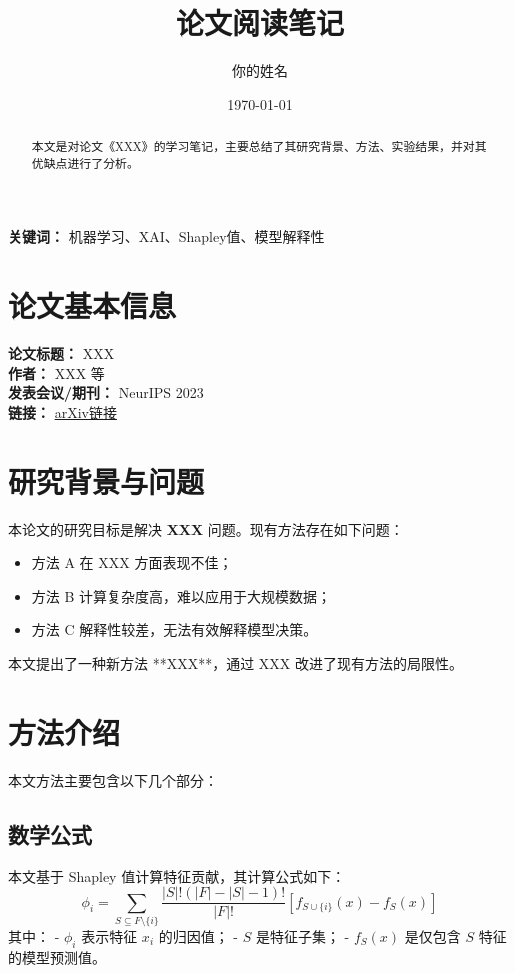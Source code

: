 \documentclass[a4paper,12pt]{article}
\title{论文阅读笔记}
\author{你的姓名}
\date{\today}
\begin{document}
\maketitle

\begin{abstract}
本文是对论文《XXX》的学习笔记，主要总结了其研究背景、方法、实验结果，并对其优缺点进行了分析。
\end{abstract}

\textbf{关键词：} 机器学习、XAI、Shapley值、模型解释性

\section{论文基本信息}
\textbf{论文标题：} XXX \\
\textbf{作者：} XXX 等 \\
\textbf{发表会议/期刊：} NeurIPS 2023 \\
\textbf{链接：} \href{https://arxiv.org/abs/XXX}{arXiv链接}

\section{研究背景与问题}
本论文的研究目标是解决 \textbf{XXX} 问题。现有方法存在如下问题：
\begin{itemize}
    \item 方法 A 在 XXX 方面表现不佳；
    \item 方法 B 计算复杂度高，难以应用于大规模数据；
    \item 方法 C 解释性较差，无法有效解释模型决策。
\end{itemize}
本文提出了一种新方法 **XXX**，通过 XXX 改进了现有方法的局限性。

\section{方法介绍}
本文方法主要包含以下几个部分：

\subsection{数学公式}
本文基于 Shapley 值计算特征贡献，其计算公式如下：
\begin{equation}
\phi_i = \sum_{S \subseteq F \setminus \{i\}} \frac{|S|!(|F| - |S| - 1)!}{|F|!} \left[ f_{S \cup \{i\}}(x) - f_S(x) \right]
\end{equation}
其中：
- \( \phi_i \) 表示特征 \( x_i \) 的归因值；
- \( S \) 是特征子集；
- \( f_S(x) \) 是仅包含 \( S \) 特征的模型预测值。
\end{document}
